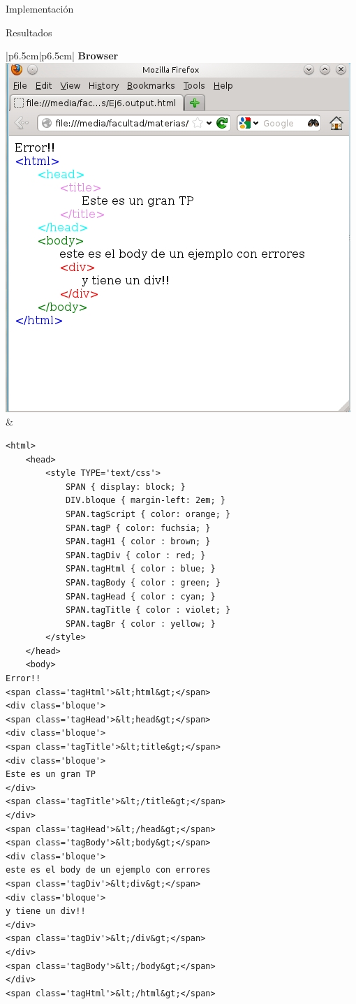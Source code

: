 \documentclass[a4paper,8pt]{article}
\begin{document}
\begin{section}{Implementación}
\begin{subsection}{Resultados}
\begin{tabular}{|p{6.5cm}|p{6.5cm}|}
\textbf{Browser}\linebreak \linebreak
\centering \includegraphics[scale=0.50]{ej6_out.jpg} & \footnotesize{\begin{verbatim}<html>
    <head>
        <style TYPE='text/css'>
            SPAN { display: block; }
            DIV.bloque { margin-left: 2em; }
            SPAN.tagScript { color: orange; }
            SPAN.tagP { color: fuchsia; }
            SPAN.tagH1 { color : brown; }
            SPAN.tagDiv { color : red; }
            SPAN.tagHtml { color : blue; }
            SPAN.tagBody { color : green; }
            SPAN.tagHead { color : cyan; }
            SPAN.tagTitle { color : violet; }
            SPAN.tagBr { color : yellow; }
        </style>
    </head>
    <body>
Error!!
<span class='tagHtml'>&lt;html&gt;</span>
<div class='bloque'>
<span class='tagHead'>&lt;head&gt;</span>
<div class='bloque'>
<span class='tagTitle'>&lt;title&gt;</span>
<div class='bloque'>
Este es un gran TP
</div>
<span class='tagTitle'>&lt;/title&gt;</span>
</div>
<span class='tagHead'>&lt;/head&gt;</span>
<span class='tagBody'>&lt;body&gt;</span>
<div class='bloque'>
este es el body de un ejemplo con errores
<span class='tagDiv'>&lt;div&gt;</span>
<div class='bloque'>
y tiene un div!!
</div>
<span class='tagDiv'>&lt;/div&gt;</span>
</div>
<span class='tagBody'>&lt;/body&gt;</span>
</div>
<span class='tagHtml'>&lt;/html&gt;</span>


\end{verbatim}}
\end{tabular}
\end{subsection}
\end{section}
\end{document}
